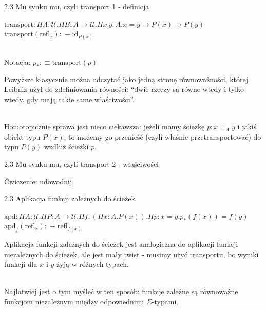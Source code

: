 \documentclass{beamer}
\newcommand{\U}{\mathcal{U}}
\newcommand{\refl}[1]{\text{refl}_{#1}}
\newcommand{\apd}[2]{\text{apd}_{#1}(#2)}
\begin{document}
\begin{frame}{2.3 Mu synku mu, czyli transport 1 - definicja}

\begin{definition}

$\text{transport} : \Pi A : \U. \Pi B : A \to \U. \Pi x\ y : A. x = y \to P(x) \to P(y)$ \\
$\text{transport}(\refl{x}) :\equiv \text{id}_{P(x)}$ \\~\

Notacja: $p_* :\equiv \text{transport}(p)$

\end{definition}

Powyższe klasycznie można odczytać jako jedną stronę równoważności, której Leibniz użył do zdefiniowania równości: ``dwie rzeczy są równe wtedy i tylko wtedy, gdy mają takie same właściwości''.\\~\

Homotopicznie sprawa jest nieco ciekawsza: jeżeli mamy ścieżkę $p : x =_A y$ i jakiś obiekt typu $P(x)$, to możemy go przenieść (czyli właśnie przetransportować) do typu $P(y)$ wzdłuż ścieżki $p$.

\end{frame}

\begin{frame}{2.3 Mu synku mu, czyli transport 2 - właściwości}


Ćwiczenie: udowodnij.

\end{frame}

\begin{frame}{2.3 Aplikacja funkcji zależnych do ścieżek}

\begin{definition}[Lemat 2.3.4]

$\text{apd} : \Pi A : \U. \Pi P : A \to \U. \Pi f : (\Pi x : A. P(x)). \Pi p : x = y. p_*(f(x)) = f(y)$ \\
$\apd{f}{\refl{x}} :\equiv \refl{f(x)}$

\end{definition}

Aplikacja funkcji zależnych do ścieżek jest analogiczna do aplikacji funkcji niezależnych do ścieżek, ale jest mały twist - musimy użyć transportu, bo wyniki funkcji dla $x$ i $y$ żyją w różnych typach. \\~\

Najłatwiej jest o tym myśleć w ten sposób: funkcje zależne są równoważne funkcjom niezależnym między odpowiednimi $\Sigma$-typami.

\end{frame}
\end{document}
